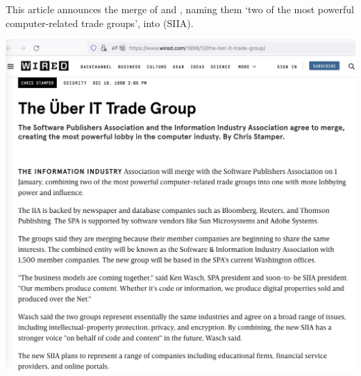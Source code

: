 
This article announces the merge of \Spa and \Iia,
naming them `two of the most powerful computer-related trade groups', into \Siia (SIIA).

\begin{center}
    \includegraphics[width=\textwidth]{wired}
\end{center}

\pagebreak
